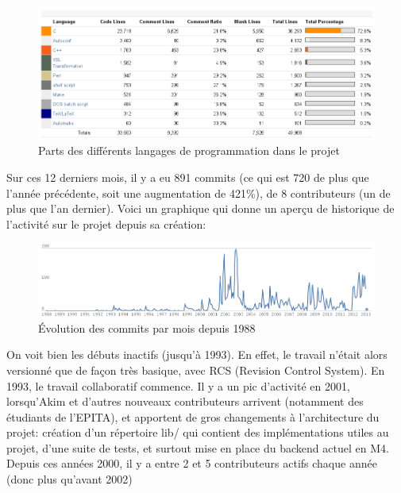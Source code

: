 \documentclass[a4paper,11pt,twoside,final]{article}
\begin{document}
  \begin{figure}[H]
    \begin{adjustwidth}{-2cm}{-2cm}
      \begin{center}
        \includegraphics[scale=0.55]{images/language-breakdown}
        \caption{Parts des différents langages de programmation dans le projet}
      \end{center}
    \end{adjustwidth}
  \end{figure}

  Sur ces 12 derniers mois, il y a eu 891 commits (ce qui est 720 de plus que
  l'année précédente, soit une augmentation de 421\%), de 8 contributeurs (un
  de plus que l'an dernier). Voici un graphique qui donne un aperçu de
  historique de l'activité sur le projet depuis sa création:

  \begin{figure}[H]
    \begin{adjustwidth}{-2cm}{-2cm}
      \begin{center}
        \includegraphics[scale=0.55]{images/commits-per-month}
        \caption{Évolution des commits par mois depuis 1988}
      \end{center}
    \end{adjustwidth}
  \end{figure}

  On voit bien les débuts inactifs (jusqu'à 1993). En effet, le travail n'était
  alors versionné que de façon très basique, avec RCS (Revision Control
  System). En 1993, le travail collaboratif commence. Il y a un pic d'activité
  en 2001, lorsqu'Akim et d'autres nouveaux contributeurs arrivent (notamment
  des étudiants de l'EPITA), et apportent de gros changements à l'architecture
  du projet: création d'un répertoire lib/ qui contient des implémentations
  utiles au projet, d'une suite de tests, et surtout mise en place du backend
  actuel en M4. Depuis ces années 2000, il y a entre 2 et 5 contributeurs
  actifs chaque année (donc plus qu'avant 2002)
\end{document}
